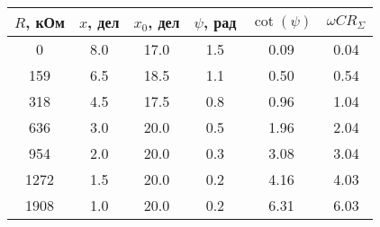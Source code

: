 \begin{tabular}{cccccc}
\toprule
$R$, кОм & $x$, дел & $x_0$, дел & $\psi$, рад & $\cot(\psi)$ & $\omega C R_\Sigma$ \\
\midrule
0    & 8.0 & 17.0 & 1.5 & 0.09 & 0.04 \\
159  & 6.5 & 18.5 & 1.1 & 0.50 & 0.54 \\
318  & 4.5 & 17.5 & 0.8 & 0.96 & 1.04 \\
636  & 3.0 & 20.0 & 0.5 & 1.96 & 2.04 \\
954  & 2.0 & 20.0 & 0.3 & 3.08 & 3.04 \\
1272 & 1.5 & 20.0 & 0.2 & 4.16 & 4.03 \\
1908 & 1.0 & 20.0 & 0.2 & 6.31 & 6.03 \\
\bottomrule
\end{tabular}